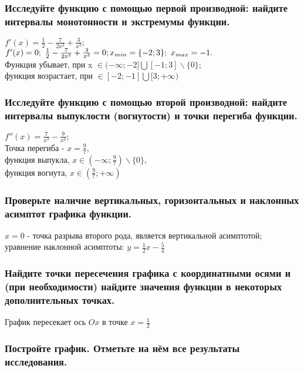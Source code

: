 \documentclass[a4paper,12pt]{article}
\begin{document}
\subsubsection{Исследуйте функцию с помощью первой производной: найдите интервалы монотонности и экстремумы функции.}

$f'(x)=\frac12-\frac7{2x^2}+\frac{3}{x^3};$\\
$f'(x)=0;\ \frac12-\frac7{2x^2}+\frac{3}{x^3}=0;\\
x_{min}=\{-2; 3\};\ x_{max}=-1.$\\
Функция убывает, при x
	$\in(-\infty;-2]\bigcup[-1;3]\backslash\{0\}$;\\
функция возрастает, при $\in[-2;-1]\bigcup[3;+\infty)$

\subsubsection{Исследуйте функцию с помощью второй производной: найдите интервалы выпуклости (вогнутости) и точки перегиба функции.}

$f''(x)=\frac7{x^3}-\frac9{x^4};$\\
Точка перегиба - $x=\frac97,$\\
функция выпукла, $x\in(-\infty;\frac97)\backslash\{0\},$\\
функция вогнута, $x\in(\frac97;+\infty)$

\subsubsection{Проверьте наличие вертикальных, горизонтальных и наклонных асимптот графика функции.}

$x=0$ - точка разрыва второго рода, является вертикальной асимптотой;\\
уравнение наклонной асимптоты: $y=\frac12x-\frac54$

\subsubsection{Найдите точки пересечения графика с координатными осями и (при необходимости) найдите значения функции в некоторых дополнительных точках.}

График пересекает ось $Ox$ в точке $x=\frac12$

\subsubsection{Постройте график. Отметьте на нём все результаты исследования.}
\end{document}
